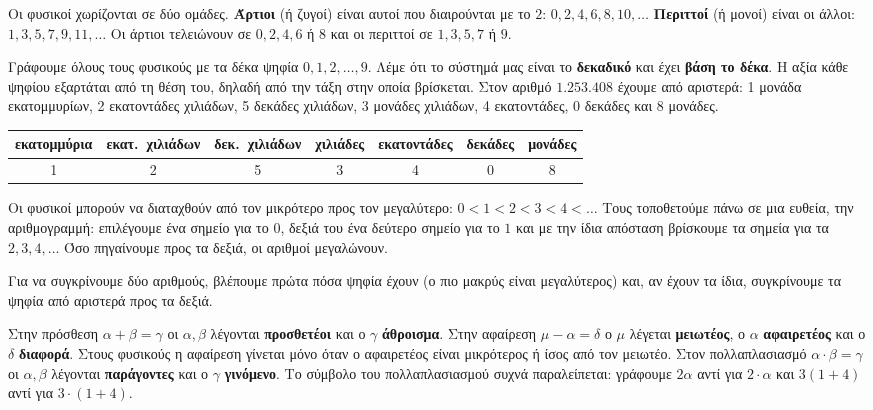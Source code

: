 Οι φυσικοί χωρίζονται σε δύο ομάδες. \textbf{Άρτιοι} (ή ζυγοί) είναι αυτοί που διαιρούνται με το $2$: $0,2,4,6,8,10,\dots$ \textbf{Περιττοί} (ή μονοί) είναι οι άλλοι: $1,3,5,7,9,11,\dots$ Οι άρτιοι τελειώνουν σε $0,2,4,6$ ή $8$ και οι περιττοί σε $1,3,5,7$ ή $9$.


Γράφουμε όλους τους φυσικούς με τα δέκα ψηφία $0,1,2,\dots,9$. Λέμε ότι το σύστημά μας είναι το \textbf{δεκαδικό} και έχει \textbf{βάση το δέκα}. Η αξία κάθε ψηφίου εξαρτάται από τη θέση του, δηλαδή από την τάξη στην οποία βρίσκεται. Στον αριθμό $1.253.408$ έχουμε από αριστερά: 1 μονάδα εκατομμυρίων, 2 εκατοντάδες χιλιάδων, 5 δεκάδες χιλιάδων, 3 μονάδες χιλιάδων, 4 εκατοντάδες, 0 δεκάδες και 8 μονάδες.

\begin{center}
\renewcommand{\arraystretch}{1.5}\setlength{\tabcolsep}{5pt}
\small
\begin{tabular}{|c|c|c|c|c|c|c|}\hline
\scriptsize εκατομμύρια & \scriptsize εκατ.\ χιλιάδων & \scriptsize δεκ.\ χιλιάδων & \scriptsize χιλιάδες & \scriptsize εκατοντάδες & \scriptsize δεκάδες & \scriptsize μονάδες\\\hline
1 & 2 & 5 & 3 & 4 & 0 & 8\\\hline
\end{tabular}
\end{center}


Οι φυσικοί μπορούν να διαταχθούν από τον μικρότερο προς τον μεγαλύτερο: $0<1<2<3<4<\dots$ Τους τοποθετούμε πάνω σε μια ευθεία, την αριθμογραμμή: επιλέγουμε ένα σημείο για το $0$, δεξιά του ένα δεύτερο σημείο για το $1$ και με την ίδια απόσταση βρίσκουμε τα σημεία για τα $2,3,4,\dots$ Όσο πηγαίνουμε προς τα δεξιά, οι αριθμοί μεγαλώνουν.

\begin{center}
\end{center}

Για να συγκρίνουμε δύο αριθμούς, βλέπουμε πρώτα πόσα ψηφία έχουν (ο πιο μακρύς είναι μεγαλύτερος) και, αν έχουν τα ίδια, συγκρίνουμε τα ψηφία από αριστερά προς τα δεξιά.


Στην πρόσθεση $\alpha+\beta=\gamma$ οι $\alpha,\beta$ λέγονται \textbf{προσθετέοι} και ο $\gamma$ \textbf{άθροισμα}. Στην αφαίρεση $\mu-\alpha=\delta$ ο $\mu$ λέγεται \textbf{μειωτέος}, ο $\alpha$ \textbf{αφαιρετέος} και ο $\delta$ \textbf{διαφορά}. Στους φυσικούς η αφαίρεση γίνεται μόνο όταν ο αφαιρετέος είναι μικρότερος ή ίσος από τον μειωτέο. Στον πολλαπλασιασμό $\alpha\cdot\beta=\gamma$ οι $\alpha,\beta$ λέγονται \textbf{παράγοντες} και ο $\gamma$ \textbf{γινόμενο}. Το σύμβολο του πολλαπλασιασμού συχνά παραλείπεται: γράφουμε $2\alpha$ αντί για $2\cdot\alpha$ και $3(1+4)$ αντί για $3\cdot(1+4)$.

